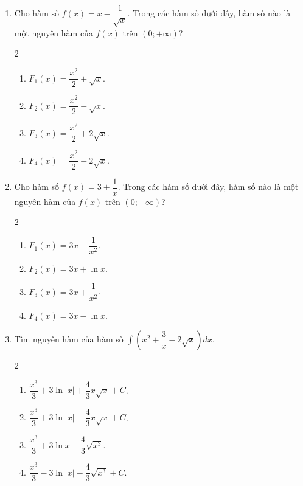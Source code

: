 \documentclass[12pt]{article}
\begin{document}
\begin{enumerate}[label=\textbf{Câu \arabic*.}]
		\item Cho hàm số $f(x) = x - \dfrac{1}{\sqrt{x}}$. Trong các hàm số dưới đây, hàm số nào là một nguyên hàm của $f(x)$ trên $(0; +\infty)$?
		\begin{multicols}{2}
			\begin{enumerate}[label=\textbf{\Alph*.}]
				\item $F_1(x) = \dfrac{x^2}{2} + \sqrt{x}$.
				\item $F_2(x) = \dfrac{x^2}{2} - \sqrt{x}$.
				\item $F_3(x) = \dfrac{x^2}{2} + 2\sqrt{x}$.
				\item $F_4(x) = \dfrac{x^2}{2} - 2\sqrt{x}$.
			\end{enumerate}
		\end{multicols}
		
		\item Cho hàm số $f(x) = 3 + \dfrac{1}{x}$. Trong các hàm số dưới đây, hàm số nào là một nguyên hàm của $f(x)$ trên $(0; +\infty)$?
		\begin{multicols}{2}
			\begin{enumerate}[label=\textbf{\Alph*.}]
				\item $F_1(x) = 3x - \dfrac{1}{x^2}$.
				\item $F_2(x) = 3x + \ln x$. 
				\item $F_3(x) = 3x + \dfrac{1}{x^2}$.
				\item $F_4(x) = 3x - \ln x$.
			\end{enumerate}
		\end{multicols}
		
		\item Tìm nguyên hàm của hàm số $\displaystyle \int \left( x^2 + \dfrac{3}{x} - 2\sqrt{x} \right) dx$.
		\begin{multicols}{2}
			\begin{enumerate}[label=\textbf{\Alph*.}]
				\item $\dfrac{x^3}{3} + 3\ln|x| + \dfrac{4}{3}x\sqrt{x} + C$.
				\item $\dfrac{x^3}{3} + 3\ln|x| - \dfrac{4}{3}x\sqrt{x} + C$.
				\item $\dfrac{x^3}{3} + 3\ln x - \dfrac{4}{3}\sqrt{x^3}$.
				\item $\dfrac{x^3}{3} - 3\ln|x| - \dfrac{4}{3}\sqrt{x^3} + C$.
			\end{enumerate}
		\end{multicols}
		

\end{enumerate}
\end{document}
